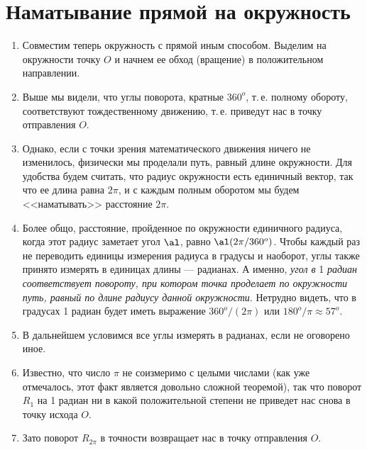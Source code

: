 \section{Наматывание прямой на окружность}


\begin{enumerate}
\item Совместим теперь окружность с прямой иным способом. Выделим на окружности точку $O$ и начнем ее обход (вращение) в положительном направлении.
\item Выше мы видели, что углы поворота, кратные $360^o$, т.\,е. полному обороту, соответствуют тождественному движению, т.\,е. приведут нас в точку отправления $O$.
\item Однако, если с точки зрения математического движения ничего не изменилось, физически мы проделали путь, равный длине окружности. Для удобства будем считать, что радиус окружности есть единичный вектор, так что ее длина равна $2\pi$, и с каждым полным оборотом мы будем <<наматывать>> расстояние $2\pi$.
\item Более общо, расстояние, пройденное по окружности единичного радиуса, когда этот радиус заметает угол $\al$, равно $\al(2\pi/360^o)$. Чтобы каждый раз не переводить единицы измерения радиуса в градусы и наоборот, углы также принято измерять в единицах длины --- радианах. А именно, \textit{угол в} 1 \textit{радиан соответствует повороту, при котором точка проделает по окружности путь, равный по длине радиусу данной окружности}. Нетрудно видеть, что в градусах 1 радиан будет иметь выражение $360^o/(2\pi)$ или $180^o/\pi \approx 57^o$.
\item В дальнейшем условимся все углы измерять в радианах, если не оговорено иное.
\item Известно, что число $\pi$ не соизмеримо с целыми числами (как уже отмечалось, этот факт является довольно сложной теоремой), так что поворот $R_1$ на 1 радиан ни в какой положительной степени не приведет нас снова в точку исхода $O$.
\item Зато поворот $R_{2\pi}$ в точности возвращает нас в точку отправления $O$.

\end{enumerate}

